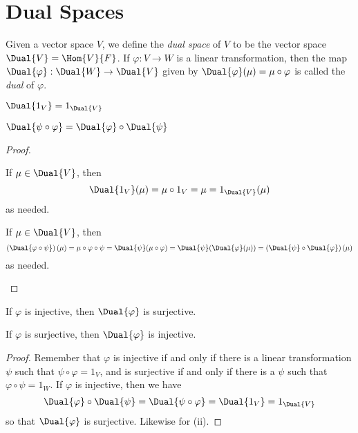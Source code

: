 \documentclass{memoir}
\begin{document}
\setcounter{section}{12}

\section{Dual Spaces}

\begin{dfn}
Given a vector space $V$, we define the \emph{dual space} of $V$ to be the vector space $\Dual{V} = \Hom{V}{F}$. If $\varphi : V \rightarrow W$ is a linear transformation, then the map $\Dual{\varphi} : \Dual{W} \rightarrow \Dual{V}$ given by $\Dual{\varphi}(\mu) = \mu \circ \varphi$ is called the \emph{dual} of $\varphi$.
\end{dfn}

\begin{prp} \mbox{}
\begin{enumerate*}
\item $\Dual{1_V} = 1_{\Dual{V}}$
\item $\Dual{\psi \circ \varphi} = \Dual{\varphi} \circ \Dual{\psi}$
\end{enumerate*}
\end{prp}

\begin{proof} \mbox{}
\begin{enumerate*}
\item If $\mu \in \Dual{V}$, then \[ \Dual{1_V}(\mu) = \mu \circ 1_V = \mu = 1_{\Dual{V}}(\mu) \] as needed.
\item If $\mu \in \Dual{V}$, then \[ \left(\Dual{\varphi \circ \psi}\right)(\mu) = \mu \circ \varphi \circ \psi = \Dual{\psi}(\mu \circ \varphi) = \Dual{\psi}(\Dual{\varphi}(\mu)) = \left(\Dual{\psi} \circ \Dual{\varphi}\right)(\mu) \] as needed. \qedhere
\end{enumerate*}
\end{proof}

\begin{prp} \mbox{}
\begin{enumerate*}
\item If $\varphi$ is injective, then $\Dual{\varphi}$ is surjective.
\item If $\varphi$ is surjective, then $\Dual{\varphi}$ is injective.
\end{enumerate*}
\end{prp}

\begin{proof}
Remember that $\varphi$ is injective if and only if there is a linear transformation $\psi$ such that $\psi \circ \varphi = 1_V$, and is surjective if and only if there is a $\psi$ such that $\varphi \circ \psi = 1_W$. If $\varphi$ is injective, then we have \[ \Dual{\varphi} \circ \Dual{\psi} = \Dual{\psi \circ \varphi} = \Dual{1_V} = 1_{\Dual{V}} \] so that $\Dual{\varphi}$ is surjective. Likewise for (ii).
\end{proof}
\end{document}
